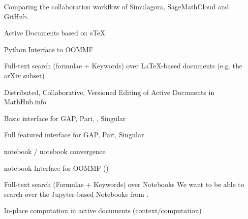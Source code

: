 \begin{workpackage}
\begin{tasklist}
\begin{task}[id=simulagora,title=Simulagora collaboration,lead=LL,PM=2]
  Comparing the collaboration workflow of Simulagora, SageMathCloud and GitHub.
\end{task}

\end{tasklist}

\begin{wpdelivs}
  \begin{wpdeliv}[id=adstex,due=6,nature=R,dissem=PU,lead=JU]
    {Active Documents based on sTeX}
  \end{wpdeliv}
  \begin{wpdeliv}[due=9,id=oommf-py,dissem=PU,nature=OTHER,lead=USO]
      {Python Interface to OOMMF}
    \end{wpdeliv}
    \begin{wpdeliv}[id=mws,due=9,nature=OTHER,dissem=PU,lead=JU]
      {Full-text search (formulae + Keywords) over LaTeX-based documents
        (e.g. the arXiv subset)}
    \end{wpdeliv}
    \begin{wpdeliv}[id=mathhub-editing,due=12,nature=DEM,dissem=PU,lead=JU]
      {Distributed, Collaborative, Versioned Editing of Active Documents in MathHub.info}
    \end{wpdeliv}
  \begin{wpdeliv}[due=12,id=ipython-kernels-basic,dissem=PU,nature=OTHER]
      {Basic \Jupyter interface for GAP, Pari, \Sage, Singular}
  \end{wpdeliv}
  \begin{wpdeliv}[due=12,id=ipython-kernels,dissem=PU,nature=OTHER]
      {Full featured \Jupyter interface for GAP, Pari, Singular}
  \end{wpdeliv}

  \begin{wpdeliv}[due=12,id=ipython-kernel-sage,dissem=PU,nature=DEM]
      {\Sage notebook / \Jupyter notebook convergence}
  \end{wpdeliv}

    \begin{wpdeliv}[due=15,id=oommf-nb,dissem=PU,nature=DEM,lead=USO]
      {\Jupyter notebook Interface for OOMMF (\OOMMFNB{})}
    \end{wpdeliv}

    \begin{wpdeliv}[id=notebooksearch,due=18,nature=OTHER,dissem=PU,lead=JU]
      {Full-text search (Formulae + Keywords) over Notebooks}
      We want to be able to search over the Jupyter-based Notebooks from
      .
\end{wpdeliv}
    \begin{wpdeliv}[id=adcomp,due=18,nature=DEM,dissem=PU,lead=JU]
      {In-place computation in active documents (context/computation)}
    \end{wpdeliv}


\end{wpdelivs}
\end{workpackage}
